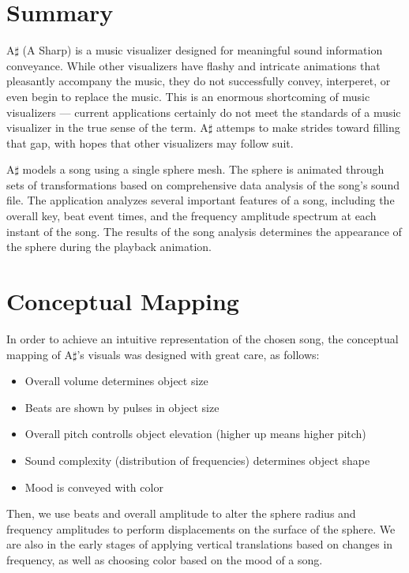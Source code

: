 \documentclass{article}
\begin{document}
\section{Summary}

A$\sharp$ (A Sharp) is a music visualizer designed for meaningful sound information conveyance. While other visualizers have flashy and intricate animations that pleasantly accompany the music, they do not successfully convey, interperet, or even begin to replace the music. This is an enormous shortcoming of music visualizers --- current applications certainly do not meet the standards of a music visualizer in the true sense of the term. A$\sharp$ attemps to make strides toward filling that gap, with hopes that other visualizers may follow suit.

A$\sharp$ models a song using a single sphere mesh. The sphere is animated through sets of transformations based on comprehensive data analysis of the song's sound file. The application analyzes several important features of a song, including the overall key, beat event times, and the frequency amplitude spectrum at each instant of the song. The results of the song analysis determines the appearance of the sphere during the playback animation.

\section{Conceptual Mapping}

In order to achieve an intuitive representation of the chosen song, the conceptual mapping of A$\sharp$'s visuals was designed with great care, as follows:

\begin{itemize}
    \item Overall volume determines object size
    \item Beats are shown by pulses in object size
    \item Overall pitch controlls object elevation (higher up means higher pitch)
    \item Sound complexity (distribution of frequencies) determines object shape
    \item Mood is conveyed with color
\end{itemize}

Then, we use beats and overall amplitude to alter the sphere radius and frequency amplitudes to perform displacements on the surface of the sphere. We are also in the early stages of applying vertical translations based on changes in frequency, as well as choosing color based on the mood of a song.
\end{document}
